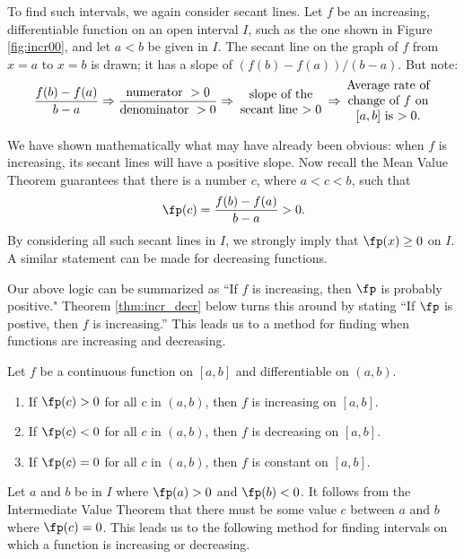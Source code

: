 To find such intervals, we again consider secant lines. Let $f$ be an increasing, differentiable function on an open interval $I$, such as the one shown in Figure \ref{fig:incr00}, and let $a<b$ be given in $I$. The secant line on the graph of $f$ from $x=a$ to $x=b$ is drawn; it has a slope of $(f(b)-f(a))/(b-a)$. But note:
$$\frac{f(b)-f(a)}{b-a} \Rightarrow \frac{\text{numerator }>0}{\text{denominator } >0} \Rightarrow \parbox{70pt}{\centering slope of the secant line $>0$} \Rightarrow \parbox{70pt}{\centering Average rate of change of $f$ on $[a,b]$ is $>0$.}$$


We have shown mathematically what may have already been obvious: when $f$ is increasing, its secant lines will have a positive slope. Now recall the Mean Value Theorem guarantees that there is a number $c$, where $a<c<b$, such that $$\fp(c) = \frac{f(b)-f(a)}{b-a}>0.$$ By considering all such secant lines in $I$, we strongly imply that $\fp(x) \geq 0$ on $I$. A similar statement can be made for decreasing functions.

Our above logic can be summarized as ``If $f$ is increasing, then $\fp$ is probably  positive." Theorem \ref{thm:incr_decr} below turns this around by stating ``If $\fp$ is postive, then $f$ is increasing.'' This leads us to a method for finding when functions are increasing and decreasing.

%
{Let $f$ be a continuous function on $[a,b]$ and differentiable on $(a,b)$.
\begin{enumerate}
\item		If $\fp(c) > 0$ for all $c$ in $(a,b)$, then $f$ is increasing on $[a,b]$.
\item		If $\fp(c) <0$ for all $c$ in $(a,b)$, then $f$ is decreasing on $[a,b]$.
\item		If $\fp(c) =0$ for all $c$ in $(a,b)$, then $f$ is constant on $[a,b]$.
\end{enumerate}
}


Let $a$ and $b$ be in $I$ where $\fp(a)>0$ and $\fp(b)<0$. It follows from the Intermediate Value Theorem that there must be some value $c$ between $a$ and $b$ where $\fp(c) = 0$. This leads us to the following method for finding intervals on which a function is increasing or decreasing.

